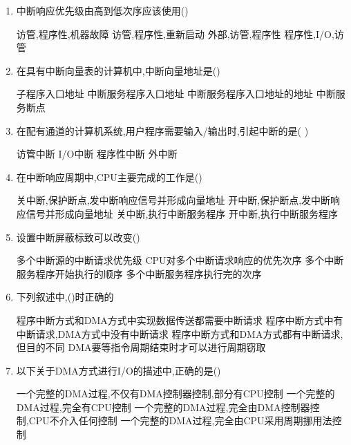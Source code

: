\documentclass[12pt, a4paper, oneside, UTF8]{ctexbook}
\begin{document}
\begin{enumerate}
    \item 中断响应优先级由高到低次序应该使用() 
    \begin{choices}[2]
        \task 访管,程序性,机器故障 
        \task 访管,程序性,重新启动 
        \task 外部,访管,程序性 
        \task 程序性,I/O,访管 
    \end{choices}

    \item 在具有中断向量表的计算机中,中断向量地址是() 
    \begin{choices}[2]
        \task 子程序入口地址 
        \task 中断服务程序入口地址 
        \task 中断服务程序入口地址的地址 
        \task 中断服务断点 
    \end{choices}

    \item 在配有通道的计算机系统,用户程序需要输入/输出时,引起中断的是(   ) 
    \begin{choices}
        \task 访管中断 \task I/O中断 \task 程序性中断 \task 外中断 
    \end{choices}

    \item 在中断响应周期中,CPU主要完成的工作是() 
    \begin{choices}[1]
        \task 关中断,保护断点,发中断响应信号并形成向量地址 
        \task 开中断,保护断点,发中断响应信号并形成向量地址 
        \task 关中断,执行中断服务程序 
        \task 开中断,执行中断服务程序  
    \end{choices}

    \item 设置中断屏蔽标致可以改变() 
    \begin{choices}[2]
        \task 多个中断源的中断请求优先级 
        \task CPU对多个中断请求响应的优先次序
        \task 多个中断服务程序开始执行的顺序 
        \task 多个中断服务程序执行完的次序 
    \end{choices}

    \item 下列叙述中,()时正确的 
    \begin{choices}[1]
        \task 程序中断方式和DMA方式中实现数据传送都需要中断请求
        \task 程序中断方式中有中断请求,DMA方式中没有中断请求
        \task 程序中断方式和DMA方式都有中断请求,但目的不同
        \task DMA要等指令周期结束时才可以进行周期窃取 
    \end{choices}

    \item 以下关于DMA方式进行I/O的描述中,正确的是() 
    \begin{choices}[1]
        \task 一个完整的DMA过程,不仅有DMA控制器控制,部分有CPU控制 
        \task 一个完整的DMA过程,完全有CPU控制 
        \task 一个完整的DMA过程,完全由DMA控制器控制,CPU不介入任何控制 
        \task 一个完整的DMA过程,完全由CPU采用周期挪用法控制
    \end{choices}


\end{enumerate}
\end{document}
